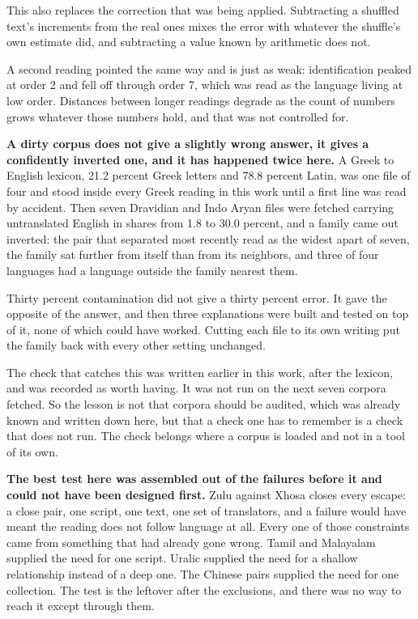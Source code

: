 This also replaces the correction that was being applied. Subtracting a shuffled text's increments from the real ones mixes the error with whatever the shuffle's own estimate did, and subtracting a value known by arithmetic does not.

A second reading pointed the same way and is just as weak: identification peaked at order 2 and fell off through order 7, which was read as the language living at low order. Distances between longer readings degrade as the count of numbers grows whatever those numbers hold, and that was not controlled for.

\textbf{A dirty corpus does not give a slightly wrong answer, it gives a confidently inverted one, and it has happened twice here.} A Greek to English lexicon, 21.2 percent Greek letters and 78.8 percent Latin, was one file of four and stood inside every Greek reading in this work until a first line was read by accident. Then seven Dravidian and Indo Aryan files were fetched carrying untranslated English in shares from 1.8 to 30.0 percent, and a family came out inverted: the pair that separated most recently read as the widest apart of seven, the family sat further from itself than from its neighbors, and three of four languages had a language outside the family nearest them.

Thirty percent contamination did not give a thirty percent error. It gave the opposite of the answer, and then three explanations were built and tested on top of it, none of which could have worked. Cutting each file to its own writing put the family back with every other setting unchanged.

The check that catches this was written earlier in this work, after the lexicon, and was recorded as worth having. It was not run on the next seven corpora fetched. So the lesson is not that corpora should be audited, which was already known and written down here, but that a check one has to remember is a check that does not run. The check belongs where a corpus is loaded and not in a tool of its own.

\textbf{The best test here was assembled out of the failures before it and could not have been designed first.} Zulu against Xhosa closes every escape: a close pair, one script, one text, one set of translators, and a failure would have meant the reading does not follow language at all. Every one of those constraints came from something that had already gone wrong. Tamil and Malayalam supplied the need for one script. Uralic supplied the need for a shallow relationship instead of a deep one. The Chinese pairs supplied the need for one collection. The test is the leftover after the exclusions, and there was no way to reach it except through them.

